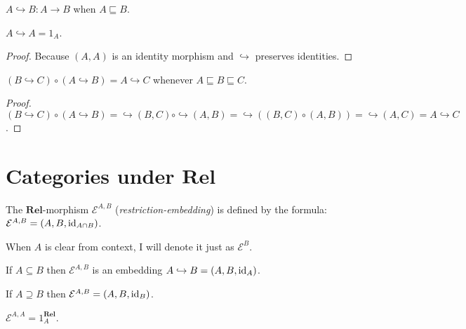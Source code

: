 \begin{obvious}
$A \hookrightarrow B : A \rightarrow B$ when $A \sqsubseteq B$.
\end{obvious}

\begin{prop}
  $A \hookrightarrow A = 1_A$.
\end{prop}

\begin{proof}
  Because $(A , A)$ is an identity morphism and $\hookrightarrow$ preserves
  identities.
\end{proof}

\begin{prop}
  $(B \hookrightarrow C) \circ (A \hookrightarrow B) = A \hookrightarrow C$
  whenever $A \sqsubseteq B \sqsubseteq C$.
\end{prop}

\begin{proof}
  $(B \hookrightarrow C) \circ (A \hookrightarrow B) = \hookrightarrow (B , C)
  \circ \hookrightarrow (A , B) = \hookrightarrow ((B , C) \circ (A , B)) =
  \hookrightarrow (A , C) = A \hookrightarrow C$.
\end{proof}

\section{\texorpdfstring{Categories under $\mathbf{Rel}$}{Categories under Rel}}

\begin{defn}
  The $\mathbf{Rel}$-morphism $\mathcal{E}^{A,B}$
  (\emph{restriction-embedding}) is defined by the formula: $\mathcal{E}^{A,B}
  = (A , B , \operatorname{id}_{A \cap B})$.
  
  When $A$ is clear from context, I will denote it just as $\mathcal{E}^B$.
\end{defn}

\begin{obvious}
If $A \subseteq B$ then $\mathcal{E}^{A,B}$ is an embedding $A \hookrightarrow B
= (A , B , \operatorname{id}_A)$.
\end{obvious}

\begin{obvious}
If $A \supseteq B$ then $\mathcal{E}^{A,B} = (A , B ,
\operatorname{id}_B)$.
\end{obvious}

\begin{obvious}
$\mathcal{E}^{A,A} = 1^{\mathbf{Rel}}_A$.
\end{obvious}

